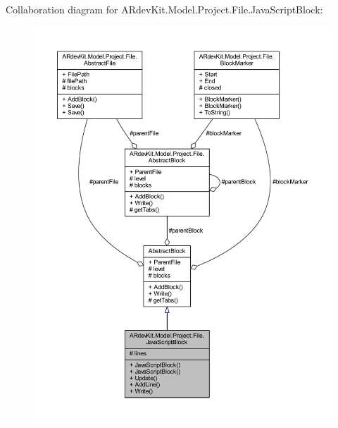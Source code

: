 Collaboration diagram for A\-Rdev\-Kit.\-Model.\-Project.\-File.\-Java\-Script\-Block\-:
\nopagebreak
\begin{figure}[H]
\begin{center}
\leavevmode
\includegraphics[width=350pt]{class_a_rdev_kit_1_1_model_1_1_project_1_1_file_1_1_java_script_block__coll__graph}
\end{center}
\end{figure}
